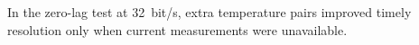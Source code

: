 In the zero-lag test at 32~bit/s, extra temperature pairs improved timely resolution only when current measurements were unavailable.
